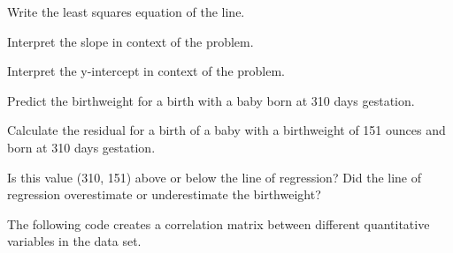 \documentclass[
]{report}
\newenvironment{Shaded}{\begin{snugshade}}{\end{snugshade}}
\newcommand{\AttributeTok}[1]{\textcolor[rgb]{0.13,0.29,0.53}{#1}}
\newcommand{\CommentTok}[1]{\textcolor[rgb]{0.56,0.35,0.01}{\textit{#1}}}
\newcommand{\FunctionTok}[1]{\textcolor[rgb]{0.13,0.29,0.53}{\textbf{#1}}}
\newcommand{\NormalTok}[1]{#1}
\newcommand{\OtherTok}[1]{\textcolor[rgb]{0.56,0.35,0.01}{#1}}
\newcommand{\SpecialCharTok}[1]{\textcolor[rgb]{0.81,0.36,0.00}{\textbf{#1}}}
\begin{document}
\begin{Shaded}
\end{Shaded}

Write the least squares equation of the line.

\vspace{0.6in}

Interpret the slope in context of the problem.

\vspace{0.6in}

Interpret the y-intercept in context of the problem.

\vspace{0.6in}

Predict the birthweight for a birth with a baby born at 310 days gestation.

\vspace{0.5in}

Calculate the residual for a birth of a baby with a birthweight of 151 ounces and born at 310 days gestation.

\vspace{0.5in}

Is this value (310, 151) above or below the line of regression? Did the line of regression overestimate or underestimate the birthweight?

\vspace{0.2in}

The following code creates a correlation matrix between different quantitative variables in the data set.
\end{document}
